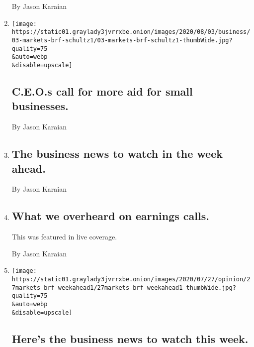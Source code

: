 \begin{enumerate}
  By Jason Karaian
\item
  \href{/2020/08/03/business/ceos-call-for-more-aid-for-small-businesses.html}{}

  \texttt{[image: https://static01.graylady3jvrrxbe.onion/images/2020/08/03/business/03-markets-brf-schultz1/03-markets-brf-schultz1-thumbWide.jpg?quality=75\\\&auto=webp\\\&disable=upscale]}

  \hypertarget{ceos-call-for-more-aid-for-small-businesses}{%
  \subsection{C.E.O.s call for more aid for small
  businesses.}\label{ceos-call-for-more-aid-for-small-businesses}}

  By Jason Karaian
\item
  \href{/2020/08/03/business/the-business-news-to-watch-in-the-week-ahead.html}{}

  \hypertarget{the-business-news-to-watch-in-the-week-ahead}{%
  \subsection{The business news to watch in the week
  ahead.}\label{the-business-news-to-watch-in-the-week-ahead}}

  By Jason Karaian
\item
  \href{/live/2020/07/31/business/stock-market-today-coronavirus/what-we-overheard-on-earnings-calls}{}

  \hypertarget{what-we-overheard-on-earnings-calls}{%
  \subsection{What we overheard on earnings
  calls.}\label{what-we-overheard-on-earnings-calls}}

  This was featured in live coverage.

  By Jason Karaian
\item
  \href{/2020/07/27/business/heres-the-business-news-to-watch-this-week.html}{}

  \texttt{[image: https://static01.graylady3jvrrxbe.onion/images/2020/07/27/opinion/27markets-brf-weekahead1/27markets-brf-weekahead1-thumbWide.jpg?quality=75\\\&auto=webp\\\&disable=upscale]}

  \hypertarget{heres-the-business-news-to-watch-this-week-1}{%
  \subsection{Here's the business news to watch this
  week.}\label{heres-the-business-news-to-watch-this-week-1}}


\end{enumerate}
